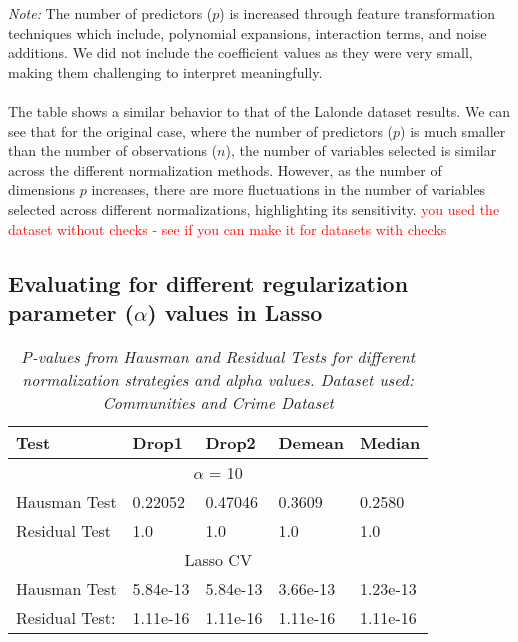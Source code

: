 \textit{Note:} The number of predictors ($p$) is increased through feature transformation techniques which include, polynomial expansions, interaction terms, and noise additions. We did not include the coefficient values as they were very small, making them challenging to interpret meaningfully. \\
\\
The table shows a similar behavior to that of the Lalonde dataset results. We can see that for the original case, where the number of predictors ($p$) is much smaller than the number of observations ($n$), the number of variables selected is similar across the different normalization methods. However, as the number of dimensions $p$ increases, there are more fluctuations in the number of variables selected across different normalizations, highlighting its sensitivity. 
\textcolor{red}{you used the dataset without checks - see if you can make it for datasets with checks}




\subsection{Evaluating for different regularization parameter ($\alpha$) values in Lasso}
\begin{table}[h!]
\renewcommand{\arraystretch}{1.5}
\centering
\begin{tabular}{||l l l l l||} 
 \hline
 \hline
 Test & Drop1 & Drop2 &  Demean & Median \\ [0.5ex] 
 \hline \hline
 \multicolumn{5}{||c||}{$\alpha$ = 10} \\ [0.5ex]
 Hausman Test & 0.22052 & 0.47046 & 0.3609 & 0.2580 \\ 
 Residual Test & 1.0 & 1.0 & 1.0 & 1.0 \\
 \hline
 \multicolumn{5}{||c||}{Lasso CV} \\ [0.5ex]
 Hausman Test & 5.84e-13 & 5.84e-13 & 3.66e-13 & 1.23e-13 \\ 
 Residual Test: & 1.11e-16 & 1.11e-16  & 1.11e-16 & 1.11e-16 \\ [1ex] 
 \hline \hline
\end{tabular}
\caption{\textit{P-values from Hausman and Residual Tests for different normalization strategies and alpha values. Dataset used: Communities and Crime Dataset}}
\label{table:1}
\end{table}



